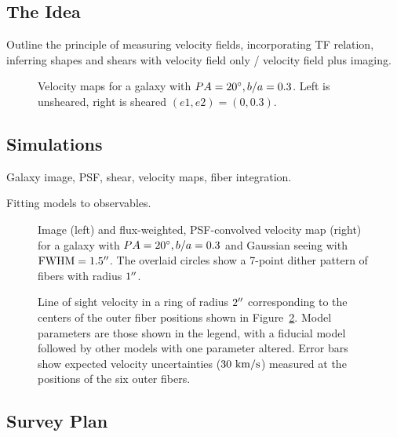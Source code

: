 \subsection{The Idea}

Outline the principle of measuring velocity fields, incorporating TF
relation, inferring shapes and shears with velocity field only /
velocity field plus imaging.

\begin{figure*}[htb]
\caption{Velocity maps for a galaxy with $PA=20\mbox{$^\circ$}, b/a=0.3$. Left is unsheared, right is sheared $(e1,e2)=(0,0.3)$.}
\label{speclens_fig:vmap}
\end{figure*}
 

\subsection{Simulations}

Galaxy image, PSF, shear, velocity maps, fiber integration.

Fitting models to observables.

\begin{figure*}[htb]
\caption{Image (left) and flux-weighted, PSF-convolved velocity map
  (right) for a galaxy with $PA=20\mbox{$^\circ$}, b/a=0.3$ and Gaussian seeing
  with $\rm{FWHM}=1.5\mbox{$^{\prime\prime}$}$. The overlaid circles show a 7-point dither
  pattern of fibers with radius $1\mbox{$^{\prime\prime}$}$.}
\label{speclens_fig:fiber_pattern}
\end{figure*}

\begin{figure*}[htb]
\caption{Line of sight velocity in a ring of radius $2\mbox{$^{\prime\prime}$}$
  corresponding to the centers of the outer fiber positions shown in
  Figure~\ref{speclens_fig:fiber_pattern}. Model parameters are those shown in
  the legend, with a fiducial model followed by other models with one
  parameter altered. Error bars show expected velocity uncertainties
  ($30~{\rm km/s}$) measured at the positions of the six outer fibers.}
\label{speclens_fig:observable}
\end{figure*}


\subsection{Survey Plan}

